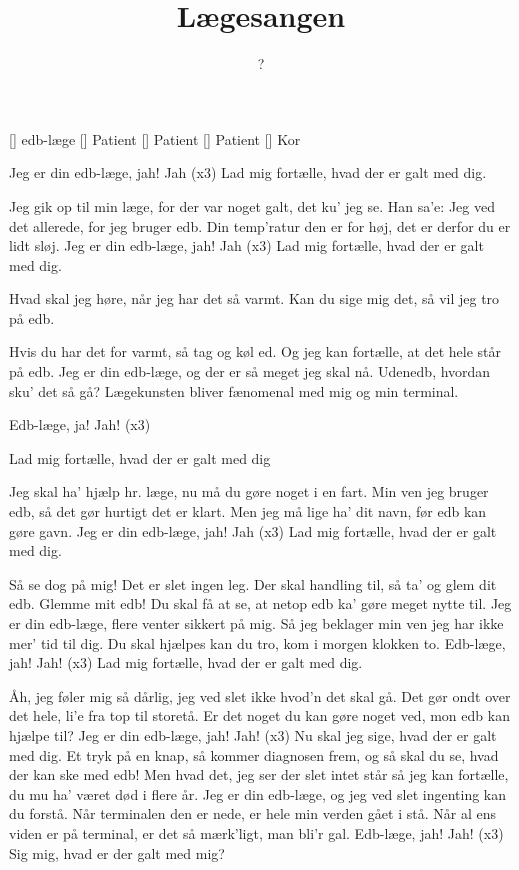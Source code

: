 \documentclass[a4paper,11pt]{article}
\title{Lægesangen}
\author{?}
\begin{document}
\maketitle

\begin{roles}
[] edb-læge
[] Patient
[] Patient
[] Patient
[] Kor
\end{roles}

\begin{song}
 Jeg er din edb-læge, jah! Jah (x3)
Lad mig fortælle, hvad der er galt med dig.

 Jeg gik op til min læge, for der var noget galt, det ku' jeg se.
Han sa'e:
 Jeg ved det allerede, for jeg bruger edb.
Din temp'ratur den er for høj,
det er derfor du er lidt sløj.
Jeg er din edb-læge, jah! Jah (x3)
Lad mig fortælle, hvad der er galt med dig.

 Hvad skal jeg høre,
når jeg har det så varmt.
Kan du sige mig det,
så vil jeg tro på edb.

 Hvis du har det for varmt,
så tag og køl ed.
Og jeg kan fortælle,
at det hele står på edb.
Jeg er din edb-læge, og der er så meget jeg skal nå.
Udenedb, hvordan sku' det så gå?
Lægekunsten bliver fænomenal
med mig og min terminal.

 Edb-læge, ja! Jah! (x3)

 Lad mig fortælle, hvad der er galt med dig

 Jeg skal ha' hjælp hr. læge, nu må du gøre noget i en fart.
 Min ven jeg bruger edb, så det gør hurtigt det er klart.
Men jeg må lige ha' dit navn,
før edb kan gøre gavn.
Jeg er din edb-læge, jah! Jah (x3)
Lad mig fortælle, hvad der er galt med dig.

 Så se dog på mig!
Det er slet ingen leg.
Der skal handling til,
så ta' og glem dit edb.
 Glemme mit edb!
Du skal få at se,
at netop edb
ka' gøre meget nytte til.
Jeg er din edb-læge, flere venter sikkert på mig.
Så jeg beklager min ven jeg har ikke mer' tid til dig.
Du skal hjælpes kan du tro,
kom i morgen klokken to.
 Edb-læge, jah! Jah! (x3)
 Lad mig fortælle, hvad der er galt med dig.

 Åh, jeg føler mig så dårlig, jeg ved slet ikke hvod'n det skal gå.
Det gør ondt over det hele, li'e fra top til storetå.
Er det noget du kan gøre noget ved,
mon edb kan hjælpe til?
 Jeg er din edb-læge, jah! Jah! (x3)
Nu skal jeg sige, hvad der er galt med dig.
Et tryk på en knap,
så kommer diagnosen frem,
og så skal du se,
hvad der kan ske med edb!
Men hvad det, jeg ser
der slet intet står
så jeg kan fortælle,
du mu ha' været død i flere år.
Jeg er din edb-læge, og jeg ved slet ingenting kan du forstå.
Når terminalen den er nede, er hele min verden gået i stå.
Når al ens viden er på terminal,
er det så mærk'ligt, man bli'r gal.
 Edb-læge, jah! Jah! (x3)
 Sig mig, hvad er der galt med mig?

\end{song}
\end{document}

